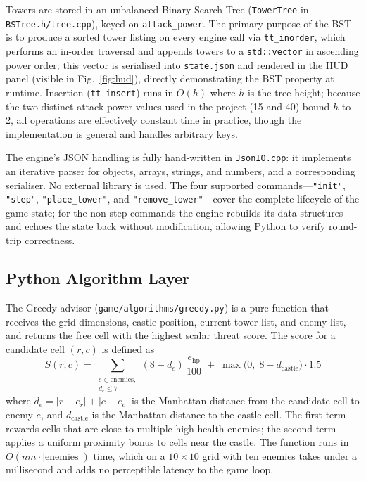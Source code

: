 \documentclass[conference]{IEEEtran}
\begin{document}
Towers are stored in an unbalanced Binary Search Tree (\texttt{TowerTree} in
\texttt{BSTree.h/tree.cpp}), keyed on \texttt{attack\_power}.
The primary purpose of the BST is to produce a sorted tower listing on every
engine call via \texttt{tt\_inorder}, which performs an in-order traversal and
appends towers to a \texttt{std::vector} in ascending power order; this vector
is serialised into \texttt{state.json} and rendered in the HUD panel (visible
in Fig.~\ref{fig:hud}), directly demonstrating the BST property at runtime.
Insertion (\texttt{tt\_insert}) runs in $O(h)$ where $h$ is the tree height;
because the two distinct attack-power values used in the project (15 and 40)
bound $h$ to 2, all operations are effectively constant time in practice, though
the implementation is general and handles arbitrary keys.

The engine's JSON handling is fully hand-written in \texttt{JsonIO.cpp}: it
implements an iterative parser for objects, arrays, strings, and numbers, and a
corresponding serialiser.
No external library is used.
The four supported commands—\texttt{"init"}, \texttt{"step"},
\texttt{"place\_tower"}, and \texttt{"remove\_tower"}—cover the complete
lifecycle of the game state; for the non-step commands the engine rebuilds its
data structures and echoes the state back without modification, allowing Python
to verify round-trip correctness.

\subsection{Python Algorithm Layer}

The Greedy advisor (\texttt{game/algorithms/greedy.py}) is a pure function that
receives the grid dimensions, castle position, current tower list, and enemy list,
and returns the free cell with the highest scalar threat score.
The score for a candidate cell $(r, c)$ is defined as
\begin{equation}
  S(r,c) = \!\!\sum_{\substack{e \in \text{enemies},\\ d_e \le 7}}
             \!\!(8 - d_e)\,\frac{e_\text{hp}}{100}
           \;+\; \max\!\bigl(0,\;8 - d_\text{castle}\bigr)\cdot 1.5 \label{eq:greedy}
\end{equation}
where $d_e = |r - e_r| + |c - e_c|$ is the Manhattan distance from the
candidate cell to enemy $e$, and $d_\text{castle}$ is the Manhattan distance
to the castle cell.
The first term rewards cells that are close to multiple high-health enemies; the
second term applies a uniform proximity bonus to cells near the castle.
The function runs in $O(nm \cdot |\text{enemies}|)$ time, which on a
$10\times 10$ grid with ten enemies takes under a millisecond and adds no
perceptible latency to the game loop.
\end{document}
